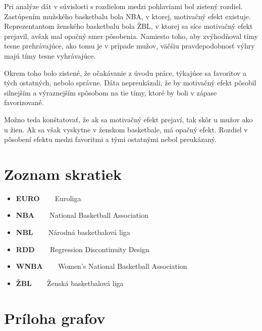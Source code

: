 \documentclass[
  digital, %
  twoside, %
  notable,   %
  lof,     %
  lot,     %
]{fithesis3}
\begin{document}
	Pri analýze dát v súvislosti s rozdielom medzi pohlaviami bol zistený rozdiel. Zastúpením mužského basketbalu bola NBA, v ktorej, motivačný efekt existuje. Reprezentantom ženského basketbalu bola ŽBL, v ktorej sa síce motivačný efekt prejavil, avšak mal opačný smer pôsobenia. Namiesto toho, aby zvýhodňoval tímy tesne prehrávajúce, ako tomu je v prípade mužov, väčšiu pravdepodobnosť výhry majú tímy tesne vyhrávajúce.
	
	Okrem toho bolo zistené, že očakávanie z úvodu práce, týkajúce sa favoritov a tých ostatných, nebolo správne. Dáta nepreukázali, že by motivačný efekt pôsobil silnejším a výraznejším spôsobom na tie tímy, ktoré by boli v zápase favorizované.
	
	Možno teda konštatovať, že ak sa motivačný efekt prejaví, tak skôr u mužov ako u žien. Ak sa však vyskytne v ženskom basketbale, má opačný efekt. Rozdiel v pôsobení efektu medzi favoritmi a tými ostatnými nebol preukázaný.
	


\printbibliography[heading=bibintoc] %

\listoffigures
{}	


\listoftables
{}


	\chapter*{Zoznam skratiek}
	{\renewcommand\labelitemi{}
	\begin{itemize}
	\item \textbf{EURO} ~~~ Euroliga
	\item \textbf{NBA} ~~~ National Basketball Association
	\item \textbf{NBL} ~~~ Národná basketbalová liga
	\item \textbf{RDD} ~~~ Regression Discontinuity Design
	\item \textbf{WNBA} ~~~ Women's National Basketball Association
	\item \textbf{ŽBL} ~~~ Ženská basketbalová liga
	\end{itemize}}

\appendix{} %

\chapter{Príloha grafov}
	
\end{document}
